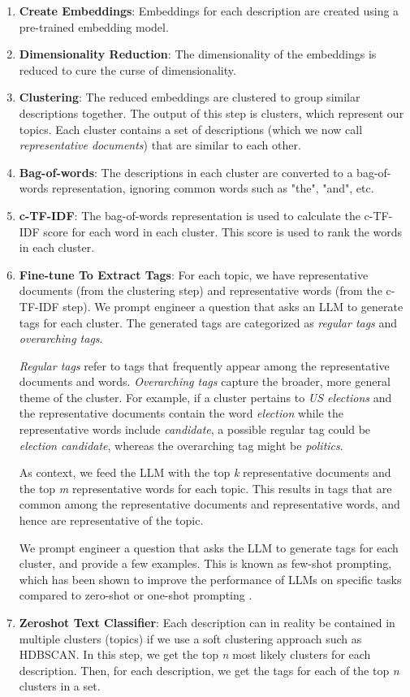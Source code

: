 \begin{enumerate}
    \item \textbf{Create Embeddings}: Embeddings for each description are created using a pre-trained embedding model.
    \item \textbf{Dimensionality Reduction}: The dimensionality of the embeddings is reduced to cure the curse of dimensionality.
    \item \textbf{Clustering}: The reduced embeddings are clustered to group similar descriptions together. The output of this step is clusters, which represent our topics. Each cluster contains a set of descriptions (which we now call \textit{representative documents}) that are similar to each other.
    \item \textbf{Bag-of-words}: The descriptions in each cluster are converted to a bag-of-words representation, ignoring common words such as "the", "and", etc.
    \item \textbf{c-TF-IDF}: The bag-of-words representation is used to calculate the c-TF-IDF score for each word in each cluster. This score is used to rank the words in each cluster.
    \item \textbf{Fine-tune To Extract Tags}: For each topic, we have representative documents (from the clustering step) and representative words (from the c-TF-IDF step). We prompt engineer a question that asks an LLM to generate tags for each cluster. The generated tags are categorized as \textit{regular tags} and \textit{overarching tags}.

    \textit{Regular tags} refer to tags that frequently appear among the representative documents and words. \textit{Overarching tags} capture the broader, more general theme of the cluster. For example, if a cluster pertains to \textit{US elections} and the representative documents contain the word \textit{election} while the representative words include \textit{candidate}, a possible regular tag could be \textit{election candidate}, whereas the overarching tag might be \textit{politics}.

    As context, we feed the LLM with the top \textit{k} representative documents and the top \textit{m} representative words for each topic. This results in tags that are common among the representative documents and representative words, and hence are representative of the topic.

    We prompt engineer a question that asks the LLM to generate tags for each cluster, and provide a few examples. This is known as few-shot prompting, which has been shown to improve the performance of LLMs on specific tasks compared to zero-shot or one-shot prompting \cite{touvron_llama_2023,brown_language_2020,min_rethinking_2022,sivarajkumar_empirical_2024}.
    \item \textbf{Zeroshot Text Classifier}: Each description can in reality be contained in multiple clusters (topics) if we use a soft clustering approach such as HDBSCAN. In this step, we get the top \textit{n} most likely clusters for each description. Then, for each description, we get the tags for each of the top \textit{n} clusters in a set. 
    

\end{enumerate}
